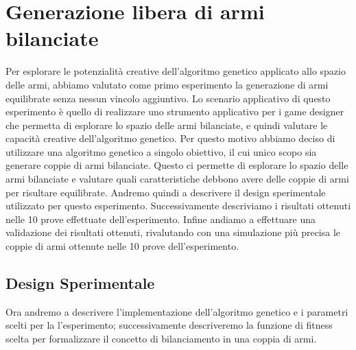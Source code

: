 \documentclass[12pt, italian]{toptesi}
\begin{document}
\chapter{Generazione libera di armi bilanciate} 
Per esplorare le potenzialità creative dell'algoritmo genetico applicato allo spazio delle armi, abbiamo valutato come primo esperimento la generazione di armi equilibrate senza nessun vincolo aggiuntivo.
Lo scenario applicativo di questo esperimento è quello di realizzare uno strumento applicativo per i game designer che permetta di esplorare lo spazio delle armi bilanciate, e quindi valutare le capacità creative dell'algoritmo genetico.
Per questo motivo abbiamo deciso di utilizzare una algoritmo genetico a singolo obiettivo, il cui unico scopo sia generare coppie di armi bilanciate. 
Questo ci permette di esplorare lo spazio delle armi bilanciate e valutare quali caratteristiche debbono avere delle coppie di armi per risultare equilibrate.
Andremo quindi a descrivere il design sperimentale utilizzato per questo esperimento.
Successivamente descriviamo i risultati ottenuti nelle 10 prove effettuate dell'esperimento.
Infine andiamo a effettuare una validazione dei risultati ottenuti, rivalutando con una simulazione più precisa le coppie di armi ottenute nelle 10 prove dell'esperimento.

\section{Design Sperimentale}
\label{sec:entropy}
Ora andremo a descrivere l'implementazione dell'algoritmo genetico e i parametri scelti per la l'esperimento; successivamente descriveremo la funzione di fitness scelta per formalizzare il concetto di bilanciamento in una coppia di armi.
\end{document}
